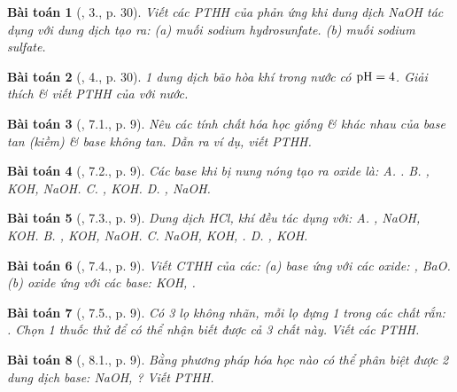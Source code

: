 \documentclass{article}
\newtheorem{baitoan}{Bài toán}
\begin{document}
\begin{baitoan}[\cite{SGK_Hoa_Hoc_9}, 3., p. 30]
	Viết các PTHH của phản ứng khi dung dịch \emph{NaOH} tác dụng với dung dịch \emph{} tạo ra: (a) muối sodium hydrosunfate. (b) muối sodium sulfate.
\end{baitoan}

\begin{baitoan}[\cite{SGK_Hoa_Hoc_9}, 4., p. 30]
	1 dung dịch bão hòa khí \emph{} trong nước có $\rm pH = 4$. Giải thích \& viết PTHH của \emph{} với nước.
\end{baitoan}

\begin{baitoan}[\cite{SGK_Hoa_Hoc_9}, 7.1., p. 9]
	Nêu các tính chất hóa học giống \& khác nhau của base tan (kiềm) \& base không tan. Dẫn ra ví dụ, viết PTHH.
\end{baitoan}

\begin{baitoan}[\cite{SGK_Hoa_Hoc_9}, 7.2., p. 9]
	Các base khi bị nung nóng tạo ra oxide là: {\sf A.} \emph{}. {\sf B.} \emph{, KOH, NaOH}. {\sf C.} \emph{, KOH}. {\sf D.} \emph{, NaOH}.
\end{baitoan}

\begin{baitoan}[\cite{SGK_Hoa_Hoc_9}, 7.3., p. 9]
	Dung dịch \emph{HCl}, khí \emph{} đều tác dụng với: {\sf A.} \emph{, NaOH, KOH}. {\sf B.} \emph{, KOH, NaOH}. {\sf C.} \emph{NaOH, KOH, }. {\sf D.} \emph{, KOH}.
\end{baitoan}

\begin{baitoan}[\cite{SGK_Hoa_Hoc_9}, 7.4., p. 9]
	Viết CTHH của các: (a) base ứng với các oxide: \emph{, BaO}. (b) oxide ứng với các base: \emph{KOH, }.
\end{baitoan}

\begin{baitoan}[\cite{SGK_Hoa_Hoc_9}, 7.5., p. 9]
	Có 3 lọ không nhãn, mỗi lọ đựng 1 trong các chất rắn: \emph{}. Chọn 1 thuốc thử để có thể nhận biết được cả 3 chất này. Viết các PTHH.
\end{baitoan}

\begin{baitoan}[\cite{SGK_Hoa_Hoc_9}, 8.1., p. 9]
	Bằng phương pháp hóa học nào có thể phân biệt được 2 dung dịch base: \emph{NaOH, }? Viết PTHH.
\end{baitoan}
\end{document}
